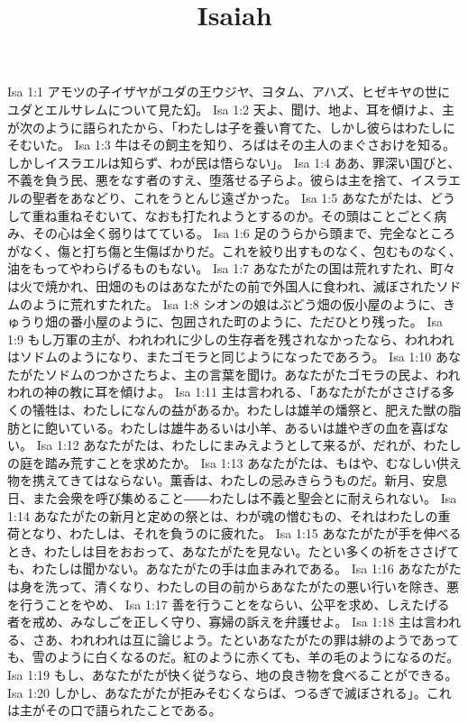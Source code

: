 

\title{Isaiah}

Isa 1:1  アモツの子イザヤがユダの王ウジヤ、ヨタム、アハズ、ヒゼキヤの世にユダとエルサレムについて見た幻。
Isa 1:2  天よ、聞け、地よ、耳を傾けよ、主が次のように語られたから、「わたしは子を養い育てた、しかし彼らはわたしにそむいた。
Isa 1:3  牛はその飼主を知り、ろばはその主人のまぐさおけを知る。しかしイスラエルは知らず、わが民は悟らない」。
Isa 1:4  ああ、罪深い国びと、不義を負う民、悪をなす者のすえ、堕落せる子らよ。彼らは主を捨て、イスラエルの聖者をあなどり、これをうとんじ遠ざかった。
Isa 1:5  あなたがたは、どうして重ね重ねそむいて、なおも打たれようとするのか。その頭はことごとく病み、その心は全く弱りはてている。
Isa 1:6  足のうらから頭まで、完全なところがなく、傷と打ち傷と生傷ばかりだ。これを絞り出すものなく、包むものなく、油をもってやわらげるものもない。
Isa 1:7  あなたがたの国は荒れすたれ、町々は火で焼かれ、田畑のものはあなたがたの前で外国人に食われ、滅ぼされたソドムのように荒れすたれた。
Isa 1:8  シオンの娘はぶどう畑の仮小屋のように、きゅうり畑の番小屋のように、包囲された町のように、ただひとり残った。
Isa 1:9  もし万軍の主が、われわれに少しの生存者を残されなかったなら、われわれはソドムのようになり、またゴモラと同じようになったであろう。
Isa 1:10  あなたがたソドムのつかさたちよ、主の言葉を聞け。あなたがたゴモラの民よ、われわれの神の教に耳を傾けよ。
Isa 1:11  主は言われる、「あなたがたがささげる多くの犠牲は、わたしになんの益があるか。わたしは雄羊の燔祭と、肥えた獣の脂肪とに飽いている。わたしは雄牛あるいは小羊、あるいは雄やぎの血を喜ばない。
Isa 1:12  あなたがたは、わたしにまみえようとして来るが、だれが、わたしの庭を踏み荒すことを求めたか。
Isa 1:13  あなたがたは、もはや、むなしい供え物を携えてきてはならない。薫香は、わたしの忌みきらうものだ。新月、安息日、また会衆を呼び集めること――わたしは不義と聖会とに耐えられない。
Isa 1:14  あなたがたの新月と定めの祭とは、わが魂の憎むもの、それはわたしの重荷となり、わたしは、それを負うのに疲れた。
Isa 1:15  あなたがたが手を伸べるとき、わたしは目をおおって、あなたがたを見ない。たとい多くの祈をささげても、わたしは聞かない。あなたがたの手は血まみれである。
Isa 1:16  あなたがたは身を洗って、清くなり、わたしの目の前からあなたがたの悪い行いを除き、悪を行うことをやめ、
Isa 1:17  善を行うことをならい、公平を求め、しえたげる者を戒め、みなしごを正しく守り、寡婦の訴えを弁護せよ。
Isa 1:18  主は言われる、さあ、われわれは互に論じよう。たといあなたがたの罪は緋のようであっても、雪のように白くなるのだ。紅のように赤くても、羊の毛のようになるのだ。
Isa 1:19  もし、あなたがたが快く従うなら、地の良き物を食べることができる。
Isa 1:20  しかし、あなたがたが拒みそむくならば、つるぎで滅ぼされる」。これは主がその口で語られたことである。
